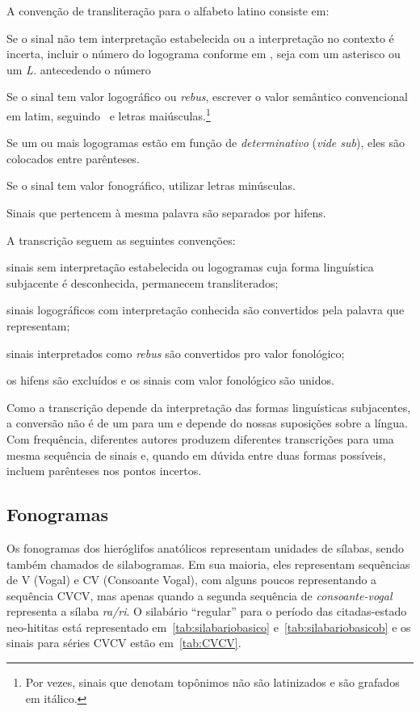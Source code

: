 \noindent A convenção de transliteração para o alfabeto latino consiste em:
\noprelistbreak%
\begin{compactenum}
	\item Se o sinal não tem interpretação estabelecida ou a interpretação no
		contexto é incerta, incluir o número do logograma conforme em
		\citet{LarocheHH}, seja com um asterisco ou um \emph{L.} antecedendo o
		número
	\item Se o sinal tem valor logográfico ou \emph{rebus},
		escrever o valor semântico convencional em latim,
		seguindo~\citet{LarocheHH} e letras maiúsculas.\footnote{Por vezes,
		sinais que denotam topônimos não são latinizados e são grafados em itálico.}
	\item Se um ou mais logogramas estão em função de \emph{determinativo}
		(\emph{vide sub}), eles são colocados entre parênteses.
	\item Se o sinal tem valor fonográfico, utilizar letras minúsculas.
	\item Sinais que pertencem à mesma palavra são separados por hifens.
\end{compactenum}
A transcrição seguem as seguintes convenções:
\begin{compactenum}
	\item sinais sem interpretação estabelecida ou logogramas cuja forma linguística
	subjacente é desconhecida, permanecem transliterados;
	\item sinais logográficos com interpretação conhecida são convertidos pela
	palavra que representam;
	\item sinais interpretados como \emph{rebus} são convertidos pro valor
	fonológico;
	\item os hifens são excluídos e os sinais com valor fonológico são unidos.
\end{compactenum}
Como a transcrição depende da interpretação das formas linguísticas subjacentes,
a conversão não é de um para um e depende do nossas suposições sobre a língua.
Com frequência, diferentes autores produzem diferentes transcrições para uma mesma
sequência de sinais e, quando em dúvida entre duas formas possíveis, incluem
parênteses nos pontos incertos.

\subsection{Fonogramas}

Os fonogramas dos hieróglifos anatólicos representam unidades de sílabas, sendo
também chamados de silabogramas.
Em sua maioria, eles representam sequências de V (Vogal) e CV (Consoante Vogal),
com alguns poucos representando a sequência CVCV, mas apenas quando a segunda 
sequência de \emph{consoante-vogal} representa a sílaba \emph{ra\slash{}ri}.\@
O silabário ``regular'' para o período das citadas-estado neo-hititas está 
representado em~\autoref{tab:silabariobasico} e~\autoref{tab:silabariobasicob} e
os sinais para séries CVCV estão em~\autoref{tab:CVCV}.

